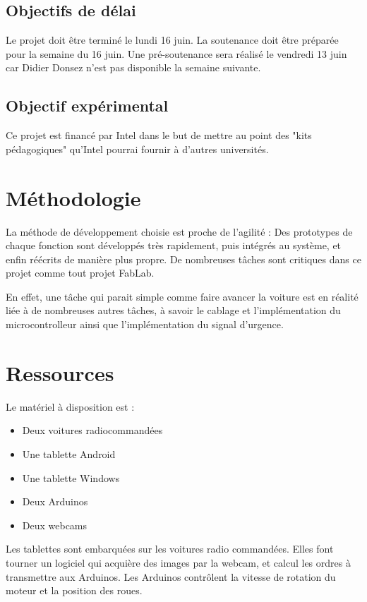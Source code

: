 \documentclass[a4paper,12pt]{article}
\begin{document}
\subsection{Objectifs de délai}

Le projet doit être terminé le lundi 16 juin. La soutenance doit être préparée pour la
semaine du 16 juin.  Une pré-soutenance sera réalisé le vendredi 13 juin car Didier
Donsez n'est pas disponible la semaine suivante.

\subsection{Objectif expérimental}

Ce projet est financé par Intel dans le but de mettre au point des "kits
pédagogiques" qu'Intel pourrai fournir à d'autres universités.

\section{Méthodologie}

La méthode de développement choisie est proche de l'agilité : Des prototypes de
chaque fonction sont développés très rapidement, puis intégrés au système, et
enfin réécrits de manière plus propre. De nombreuses tâches sont critiques
dans ce projet comme tout projet FabLab.

En effet, une tâche qui parait simple comme faire avancer la voiture est en
réalité liée à de nombreuses autres tâches, à savoir le cablage et
l'implémentation du microcontrolleur ainsi que l'implémentation du signal
d'urgence.

\section{Ressources}

Le matériel à disposition est :
\begin{itemize}
    \item Deux voitures radiocommandées
    \item Une tablette Android
    \item Une tablette Windows
    \item Deux Arduinos
    \item Deux webcams
\end{itemize}

Les tablettes sont embarquées sur les voitures radio commandées. Elles font
tourner un logiciel qui acquière des images par la webcam, et calcul les ordres
à transmettre aux Arduinos. Les Arduinos contrôlent la vitesse de rotation du
moteur et la position des roues.
\end{document}
